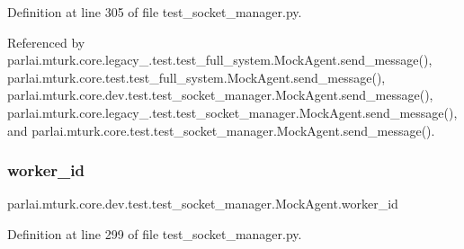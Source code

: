 Definition at line 305 of file test\+\_\+socket\+\_\+manager.\+py.



Referenced by parlai.\+mturk.\+core.\+legacy\+\_.\+test.\+test\+\_\+full\+\_\+system.\+Mock\+Agent.\+send\+\_\+message(), parlai.\+mturk.\+core.\+test.\+test\+\_\+full\+\_\+system.\+Mock\+Agent.\+send\+\_\+message(), parlai.\+mturk.\+core.\+dev.\+test.\+test\+\_\+socket\+\_\+manager.\+Mock\+Agent.\+send\+\_\+message(), parlai.\+mturk.\+core.\+legacy\+\_.\+test.\+test\+\_\+socket\+\_\+manager.\+Mock\+Agent.\+send\+\_\+message(), and parlai.\+mturk.\+core.\+test.\+test\+\_\+socket\+\_\+manager.\+Mock\+Agent.\+send\+\_\+message().

\mbox{\label{classparlai_1_1mturk_1_1core_1_1dev_1_1test_1_1test__socket__manager_1_1MockAgent_adabb3feeb1730f04d80f84c855d86200}} 
\subsubsection{\texorpdfstring{worker\+\_\+id}{worker\_id}}
{\footnotesize\ttfamily parlai.\+mturk.\+core.\+dev.\+test.\+test\+\_\+socket\+\_\+manager.\+Mock\+Agent.\+worker\+\_\+id}



Definition at line 299 of file test\+\_\+socket\+\_\+manager.\+py.



